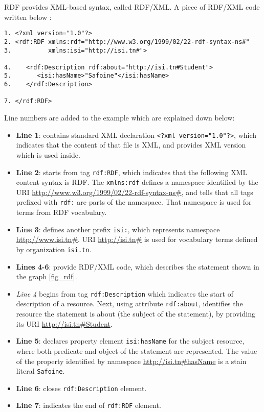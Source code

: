 RDF provides XML-based syntax, called RDF\slash XML. A piece of RDF\slash XML code written below :\\

\begin{lstlisting}[captionpos=b, caption=RDF Triple example, label={rdftriple},
basicstyle=\footnotesize,frame=single]
1. <?xml version="1.0"?>
2. <rdf:RDF xmlns:rdf="http://www.w3.org/1999/02/22-rdf-syntax-ns#"
3.          xmlns:isi="http://isi.tn#">

4.    <rdf:Description rdf:about="http://isi.tn#Student">
5.       <isi:hasName>"Safoine"</isi:hasName>
6.    </rdf:Description>

7. </rdf:RDF>       
\end{lstlisting}

\noindent Line numbers are added to the example which are explained down below:
\begin{itemize}
    \setlength{\itemsep}{0cm}
    \setlength{\parskip}{0cm}

    \item \textbf{Line 1}: contains standard XML declaration \texttt{<?xml version="1.0"?>}, which indicates that the content of that file is XML, and provides XML version which is used inside.	
    \item \textbf{Line 2}: starts from tag \texttt{rdf:RDF}, which indicates that the following XML content syntax is RDF. The \texttt{xmlns:rdf} defines a namespace identified by the URI \url{http://www.w3.org/1999/02/22-rdf-syntax-ns#}, and tells that all tags prefixed with \texttt{rdf:} are parts of the namespace. That namespace is used for terms from RDF vocabulary.
    \item \textbf{Line 3}: defines another prefix \texttt{isi:}, which represents namespace \url{http://www.isi.tn#}. URI \url{http://isi.tn#} is used for vocabulary terms defined by organization \texttt{isi.tn}.
    \item \textbf{Lines 4-6}: provide RDF/XML code, which describes the statement shown in  the graph \ref{fig_rdf}. 
    \item \textit{Line 4} begins from tag \texttt{rdf:Description} which indicates the start of description of a resource. Next, using attribute \texttt{rdf:about}, identifies the resource the statement is about (the subject of the statement), by providing its URI \url{http://isi.tn#Student}. 
    \item \textbf{Line 5}: declares property element \texttt{isi:hasName} for the subject resource, where both predicate and object of the statement are represented. The value of the property identified by namespace \url{http://isi.tn#hasName} is a stain literal \texttt{Safoine}. 
    \item \textbf{Line 6}: closes \texttt{rdf:Description} element.
    \item \textbf{Line 7}: indicates the end of \texttt{rdf:RDF} element.
\end{itemize}

